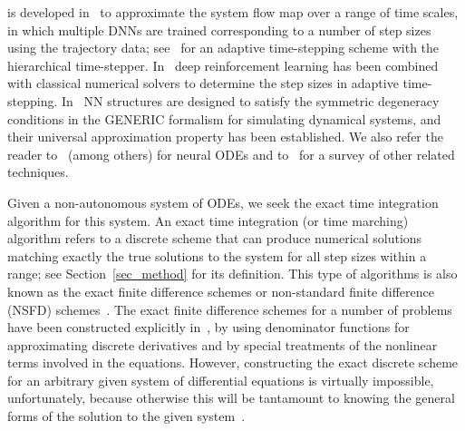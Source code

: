 is developed in~\cite{LiuKB2022} to approximate the system flow map
 over a range of time scales,
in which multiple DNNs are trained corresponding to
a number of step sizes using the trajectory data;
see~\cite{HamidRNB2023} for an adaptive time-stepping scheme
with the hierarchical time-stepper.
%
In~\cite{Dellnitzetal2023} deep reinforcement learning has been
combined with classical numerical solvers to determine the step sizes in adaptive
time-stepping.
%
In~\cite{ZhangSK2022} NN  structures are designed  to
satisfy the symmetric degeneracy conditions in the GENERIC formalism
for simulating dynamical systems, and their universal approximation
property has been established.
%
We also refer the reader to~\cite{ChenRBD2019,Kimetal2021,FronkP2024a}
(among others) for neural ODEs
and to~\cite{Legaardetal2023} for a survey of other related techniques.


Given a non-autonomous system of ODEs, we seek the exact
time integration  algorithm for this system. %
An exact time integration (or time marching) algorithm refers to a discrete scheme
that can produce numerical solutions matching exactly  the true solutions
to the system for all step sizes within a range; see Section~\ref{sec_method}
for its definition. This type of algorithms is also
known as the exact finite difference schemes or
non-standard finite difference (NSFD) schemes~\cite{Mickens2021}.
The exact finite difference schemes for a number of problems
have been constructed explicitly in~\cite{Mickens2021}, by using denominator functions
for approximating discrete derivatives and by special treatments of the nonlinear
terms involved in the equations. However, 
constructing the exact discrete scheme for
an arbitrary given system of differential equations is virtually impossible, unfortunately,
because otherwise this will be tantamount to knowing the general forms of
the solution to the given system~\cite{Mickens2021}.


